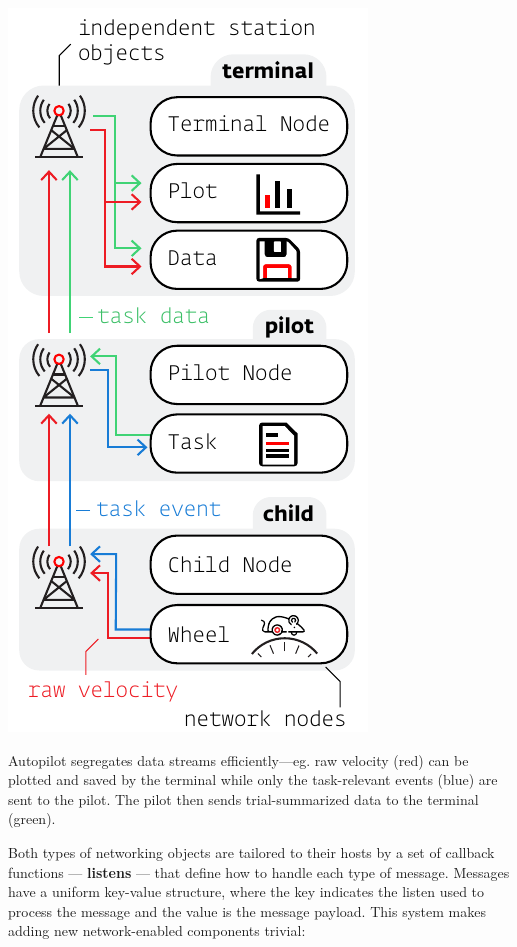 \begin{marginfigure}[0.8cm]
\includegraphics[]{figures/side_24_networking.pdf}
\caption{Autopilot segregates data streams efficiently---eg. raw velocity (red) can be plotted and saved by the terminal while only the task-relevant events (blue) are sent to the pilot. The pilot then sends trial-summarized data to the terminal (green).}
\label{fig:datastreams}
\end{marginfigure}

Both types of networking objects are tailored to their hosts by a set of callback functions --- \textbf{listens} --- that define how to handle each type of message. Messages have a uniform key-value structure, where the key indicates the listen used to process the message and the value is the message payload. This system makes adding new network-enabled components trivial:

